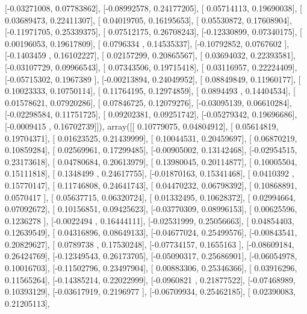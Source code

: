 \documentclass{article}
\begin{document}
       [-0.03271008,  0.07783862],
       [-0.08992578,  0.24177205],
       [ 0.05714113,  0.19690038],
       [ 0.03689473,  0.22411307],
       [ 0.04019705,  0.16195653],
       [ 0.05530872,  0.17608904],
       [-0.11971705,  0.25339375],
       [ 0.07512175,  0.26708243],
       [-0.12330899,  0.07340175],
       [ 0.00196053,  0.19617809],
       [ 0.0796334 ,  0.14535337],
       [-0.10792852,  0.0767602 ],
       [-0.1403459 ,  0.16102227],
       [ 0.02157299,  0.20865567],
       [ 0.03694032,  0.22393581],
       [-0.03107729,  0.09966543],
       [ 0.07343506,  0.19715418],
       [ 0.03116957,  0.22224409],
       [-0.05715302,  0.1967389 ],
       [-0.00213894,  0.24049952],
       [ 0.08849849,  0.11960177],
       [ 0.10023333,  0.10750114],
       [ 0.11764195,  0.12974859],
       [ 0.0894493 ,  0.14404534],
       [ 0.01578621,  0.07920286],
       [ 0.07846725,  0.12079276],
       [-0.03095139,  0.06610284],
       [-0.02298584,  0.11751725],
       [ 0.09202381,  0.09251742],
       [-0.05279342,  0.19696686],
       [-0.0009415 ,  0.16702739]]), array([[ 0.10779075,  0.04804912],
       [ 0.05614819,  0.19704371],
       [ 0.01623525,  0.21439999],
       [ 0.10044531,  0.20459697],
       [ 0.06870219,  0.10859284],
       [ 0.02569961,  0.17299485],
       [-0.00905002,  0.13142468],
       [-0.02954515,  0.23173618],
       [ 0.04780684,  0.20613979],
       [ 0.13980045,  0.20114877],
       [ 0.10005504,  0.15111818],
       [ 0.1348499 ,  0.24617755],
       [-0.01870163,  0.15341468],
       [ 0.0410392 ,  0.15770147],
       [ 0.11746808,  0.24641743],
       [ 0.04470232,  0.06798392],
       [ 0.10868891,  0.0570417 ],
       [ 0.05637715,  0.06320724],
       [ 0.01332495,  0.10628372],
       [ 0.02994664,  0.07092672],
       [ 0.10156851,  0.09425623],
       [-0.03770309,  0.08996153],
       [ 0.00625596,  0.1236278 ],
       [-0.0022494 ,  0.16444111],
       [-0.02531999,  0.25056663],
       [ 0.04854403,  0.12639549],
       [ 0.04316896,  0.08649133],
       [-0.04677024,  0.25499576],
       [-0.00843541,  0.20829627],
       [ 0.0789738 ,  0.17530248],
       [-0.07734157,  0.1655163 ],
       [-0.08609184,  0.26424769],
       [-0.12349543,  0.26173705],
       [-0.05090317,  0.25686901],
       [-0.06054978,  0.10016703],
       [-0.11502796,  0.23497904],
       [ 0.00883306,  0.25346366],
       [ 0.03916296,  0.11565264],
       [-0.14385214,  0.22022999],
       [-0.0960821 ,  0.21877522],
       [-0.07468989,  0.10393129],
       [-0.03617919,  0.2196977 ],
       [-0.06709934,  0.25462185],
       [ 0.02390083,  0.21205113],
\end{document}
